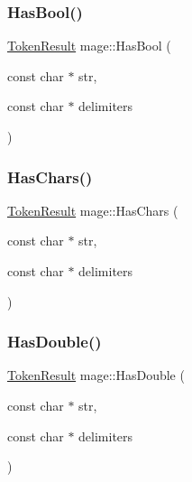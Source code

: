 \hypertarget{namespacemage_ab8d3a7642225fabd1e78f0e1fc49f1fe}{}\label{namespacemage_ab8d3a7642225fabd1e78f0e1fc49f1fe} 
\subsubsection{\texorpdfstring{Has\+Bool()}{HasBool()}}
{\footnotesize\ttfamily \hyperlink{namespacemage_a2178ba2411db5912f41b2e7698c2037d}{Token\+Result} mage\+::\+Has\+Bool (\begin{DoxyParamCaption}\item[{const char $\ast$}]{str,  }\item[{const char $\ast$}]{delimiters }\end{DoxyParamCaption})}

\hypertarget{namespacemage_a0b670c167bd464cfcb96ff4238e12f76}{}\label{namespacemage_a0b670c167bd464cfcb96ff4238e12f76} 
\subsubsection{\texorpdfstring{Has\+Chars()}{HasChars()}}
{\footnotesize\ttfamily \hyperlink{namespacemage_a2178ba2411db5912f41b2e7698c2037d}{Token\+Result} mage\+::\+Has\+Chars (\begin{DoxyParamCaption}\item[{const char $\ast$}]{str,  }\item[{const char $\ast$}]{delimiters }\end{DoxyParamCaption})}

\hypertarget{namespacemage_ac039d6b5a481b26e7440672a75ad70df}{}\label{namespacemage_ac039d6b5a481b26e7440672a75ad70df} 
\subsubsection{\texorpdfstring{Has\+Double()}{HasDouble()}}
{\footnotesize\ttfamily \hyperlink{namespacemage_a2178ba2411db5912f41b2e7698c2037d}{Token\+Result} mage\+::\+Has\+Double (\begin{DoxyParamCaption}\item[{const char $\ast$}]{str,  }\item[{const char $\ast$}]{delimiters }\end{DoxyParamCaption})}

